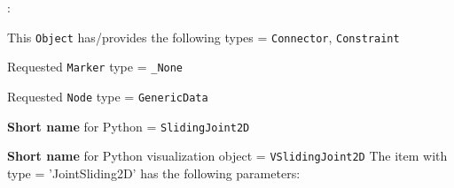 \noindent {}:
\bi
  \item This \texttt{Object} has/provides the following types = \texttt{Connector}, \texttt{Constraint}
  \item Requested \texttt{Marker} type = \texttt{\_None}
  \item Requested \texttt{Node} type = \texttt{GenericData}
  \item {\bf Short name} for Python = \texttt{SlidingJoint2D}
  \item {\bf Short name} for Python visualization object = \texttt{VSlidingJoint2D}
\ei\vspace{12pt} \noindent 
The item  with type = 'JointSliding2D' has the following parameters:
\vspace{-0.5cm}\\
\vspace{-0.5cm}\\
